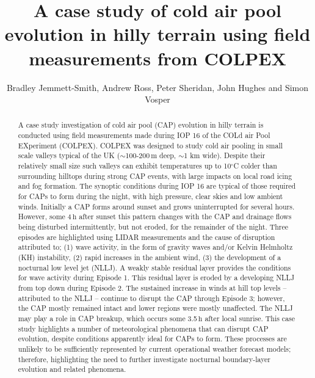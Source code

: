 \documentclass[times]{qjrms4}
\begin{document}

\title{A case study of cold air pool evolution in hilly terrain using field measurements from COLPEX}

\author{Bradley Jemmett-Smith\corrauth, Andrew Ross, Peter Sheridan, John Hughes and Simon Vosper}

\address{ University of Leeds, Leeds, UK  Met Office, Exeter, UK}


\begin{abstract}
A case study investigation of cold air pool (CAP) evolution in hilly terrain is conducted using field measurements made during IOP 16 of the COLd air Pool EXperiment (COLPEX). COLPEX was designed to study cold air pooling in small scale valleys typical of the UK ($\sim$100-200$\,\mbox{m}$ deep, $\sim$1 km wide). Despite their relatively small size such valleys can exhibit temperatures up to 10$^\circ$C colder than surrounding hilltops during strong CAP events, with large impacts on local road icing and fog formation. The synoptic conditions during IOP 16 are typical of those required for CAPs to form during the night, with high pressure, clear skies and low ambient winds. Initially a CAP forms around sunset and grows uninterrupted for several hours. However, some 4$\,\mbox{h}$ after sunset this pattern changes with the CAP and drainage flows being disturbed intermittently, but not eroded, for the remainder of the night. Three episodes are highlighted using LIDAR measurements and the cause of disruption attributed to; (1) wave activity, in the form of gravity waves and/or Kelvin Helmholtz (KH) instability, (2) rapid increases in the ambient wind, (3) the development of a nocturnal low level jet (NLLJ). A weakly stable residual layer provides the conditions for wave activity during Episode 1. This residual layer is eroded by a developing NLLJ from top down during Episode 2. The sustained increase in winds at hill top levels -- attributed to the NLLJ -- continue to disrupt the CAP through Episode 3; however, the CAP mostly remained intact and lower regions were mostly unaffected. The NLLJ may play a role in CAP breakup, which occurs some 3.5$\,\mbox{h}$ after local sunrise. This case study highlights a number of meteorological phenomena that can disrupt CAP evolution, despite conditions apparently ideal for CAPs to form. These processes are unlikely to be sufficiently represented by current operational weather forecast models; therefore, highlighting the need to further investigate nocturnal boundary-layer evolution and related phenomena.
\end{abstract}
\end{document}
